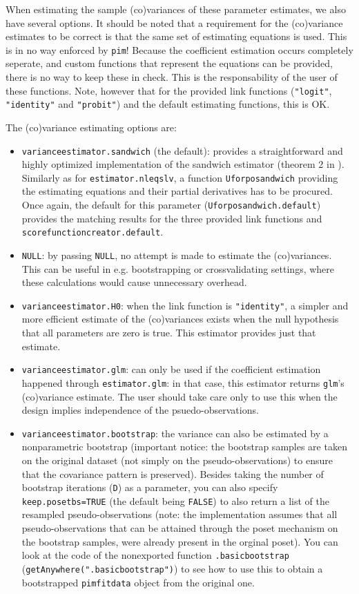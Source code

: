 \documentclass[12pt]{article}
\newcommand{\pim}[1]{\texttt{#1}}%
\newcommand{\cd}[1]{\texttt{#1}}%
\begin{document}
When estimating the sample (co)variances of these parameter estimates, we also have several options. It should be noted that a requirement for the (co)variance estimates to be correct is that the same set of estimating equations is used. This is in no way enforced by \pim{pim}! Because the coefficient estimation occurs completely seperate, and custom functions that represent the equations can be provided, there is no way to keep these in check. This is the responsability of the user of these functions. Note, however that for the provided link functions (\cd{"logit"}, \cd{"identity"} and \cd{"probit"}) and the default estimating functions, this is OK.

The (co)variance estimating options are:
\begin{itemize}
	\item \pim{varianceestimator.sandwich} (the default): provides a straightforward and highly optimized implementation of the sandwich estimator (theorem 2 in \cite{Thas2012}). Similarly as for \pim{estimator.nleqslv}, a function \cd{Uforposandwich} providing the estimating equations and their partial derivatives has to be procured. Once again, the default for this parameter (\pim{Uforposandwich.default}) provides the matching results for the three provided link functions and \pim{scorefunctioncreator.default}.
	\item \cd{NULL}: by passing \cd{NULL}, no attempt is made to estimate the (co)variances. This can be useful in e.g. bootstrapping or crossvalidating settings, where these calculations would cause unnecessary overhead.
	\item \pim{varianceestimator.H0}: when the link function is \cd{"identity"}, a simpler and more efficient estimate of the (co)variances exists when the null hypothesis that all parameters are zero is true. This estimator provides just that estimate.
	\item \pim{varianceestimator.glm}: can only be used if the coefficient estimation happened through \pim{estimator.glm}: in that case, this estimator returns \cd{glm}'s (co)variance estimate. The user should take care only to use this when the design implies independence of the psuedo-observations.
	\item \pim{varianceestimator.bootstrap}: the variance can also be estimated by a nonparametric bootstrap (important notice: the bootstrap samples are taken on the original dataset (not simply on the pseudo-observations) to ensure that the covariance pattern is preserved). Besides taking the number of bootstrap iterations (\cd{D}) as a parameter, you can also specify \cd{keep.posetbs=TRUE} (the default being \cd{FALSE}) to also return a list of the resampled pseudo-observations (note: the implementation assumes that all pseudo-observations that can be attained through the poset mechanism on the bootstrap samples, were already present in the orginal poset). You can look at the code of the nonexported function \cd{.basicbootstrap} (\cd{getAnywhere(".basicbootstrap")}) to see how to use this to obtain a bootstrapped \pim{pimfitdata} object from the original one.
\end{itemize}
\end{document}

